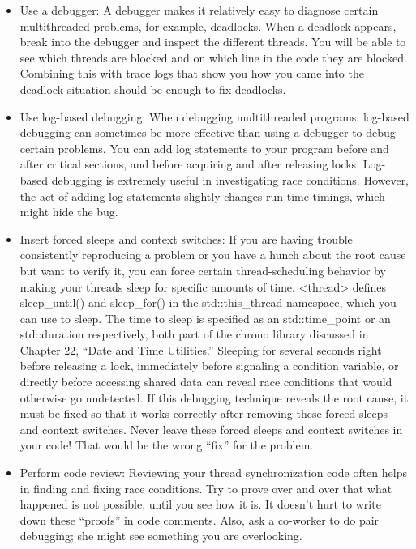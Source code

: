 \begin{itemize}
\item
Use a debugger: A debugger makes it relatively easy to diagnose certain multithreaded problems, for example, deadlocks. When a deadlock appears, break into the debugger and inspect the different threads. You will be able to see which threads are blocked and on which line in the code they are blocked. Combining this with trace logs that show you how you came into the deadlock situation should be enough to fix deadlocks.

\item
Use log-based debugging: When debugging multithreaded programs, log-based debugging can sometimes be more effective than using a debugger to debug certain problems. You can add log statements to your program before and after critical sections, and before acquiring and after releasing locks. Log-based debugging is extremely useful in investigating race conditions. However, the act of adding log statements slightly changes run-time timings, which might hide the bug.

\item
Insert forced sleeps and context switches: If you are having trouble consistently reproducing a problem or you have a hunch about the root cause but want to verify it, you can force certain thread-scheduling behavior by making your threads sleep for specific amounts of time. <thread> defines sleep\_until() and sleep\_for() in the std::this\_thread namespace, which you can use to sleep. The time to sleep is specified as an std::time\_point or an std::duration respectively, both part of the chrono library discussed in Chapter 22, “Date and Time Utilities.” Sleeping for several seconds right before releasing a lock, immediately before signaling a condition variable, or directly before accessing shared data can reveal race conditions that would otherwise go undetected. If this debugging technique reveals the root cause, it must be fixed so that it works correctly after removing these forced sleeps and context switches. Never leave these forced sleeps and context switches in your code! That would be the wrong “fix” for the problem.

\item
Perform code review: Reviewing your thread synchronization code often helps in finding and fixing race conditions. Try to prove over and over that what happened is not possible, until you see how it is. It doesn’t hurt to write down these “proofs” in code comments. Also, ask a co-worker to do pair debugging; she might see something you are overlooking.
\end{itemize}

